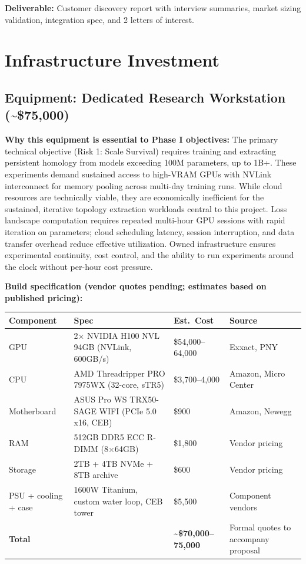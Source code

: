 \documentclass[11pt,letterpaper]{article}
\begin{document}
\textbf{Deliverable:} Customer discovery report with interview summaries, market sizing validation, integration spec, and 2 letters of interest.

\section{Infrastructure Investment}

\subsection{Equipment: Dedicated Research Workstation (\textasciitilde\$75,000)}

\textbf{Why this equipment is essential to Phase I objectives:} The primary technical objective (Risk 1: Scale Survival) requires training and extracting persistent homology from models exceeding 100M parameters, up to 1B+. These experiments demand sustained access to high-VRAM GPUs with NVLink interconnect for memory pooling across multi-day training runs. While cloud resources are technically viable, they are economically inefficient for the sustained, iterative topology extraction workloads central to this project. Loss landscape computation requires repeated multi-hour GPU sessions with rapid iteration on parameters; cloud scheduling latency, session interruption, and data transfer overhead reduce effective utilization. Owned infrastructure ensures experimental continuity, cost control, and the ability to run experiments around the clock without per-hour cost pressure.

\textbf{Build specification (vendor quotes pending; estimates based on published pricing):}

\begin{center}
\begin{tabular}{@{}p{2.2cm}p{5.5cm}p{2.8cm}p{3cm}@{}}
\toprule
\textbf{Component} & \textbf{Spec} & \textbf{Est.\ Cost} & \textbf{Source} \\
\midrule
GPU & 2$\times$ NVIDIA H100 NVL 94GB (NVLink, 600GB/s) & \$54,000--64,000 & Exxact, PNY \\
CPU & AMD Threadripper PRO 7975WX (32-core, sTR5) & \$3,700--4,000 & Amazon, Micro Center \\
Motherboard & ASUS Pro WS TRX50-SAGE WIFI (PCIe 5.0 x16, CEB) & \$900 & Amazon, Newegg \\
RAM & 512GB DDR5 ECC R-DIMM (8$\times$64GB) & \$1,800 & Vendor pricing \\
Storage & 2TB + 4TB NVMe + 8TB archive & \$600 & Vendor pricing \\
PSU + cooling + case & 1600W Titanium, custom water loop, CEB tower & \$5,500 & Component vendors \\
\midrule
\textbf{Total} & & \textbf{\textasciitilde\$70,000--75,000} & Formal quotes to accompany proposal \\
\bottomrule
\end{tabular}
\end{center}
\end{document}
